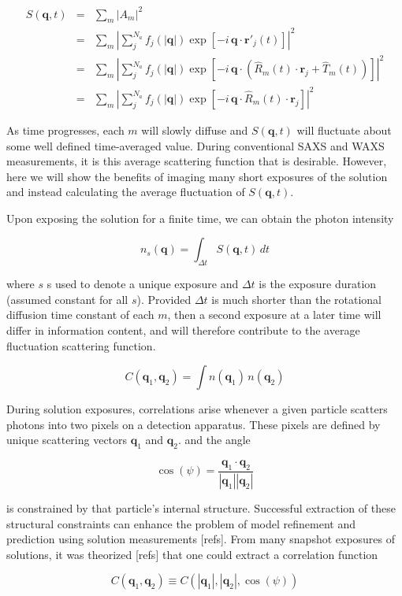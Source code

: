 \documentclass [11pt,fleqn]{article}
\def \be {\begin{equation}}
\def \ee {\end{equation}}
\def \beq {\begin{eqnarray}}
\def \eeq {\end{eqnarray}}
\begin{document}
\beq \label{ scatter}
S( \bm q, t) &=& \sum_m \left | A_m \right|^2 \\
&=& \sum_m \left | \sum_{j}^{N_a} f_j(|\bm q|) \exp [ -i \,\bm q \cdot \bm  r\prime _j (t)]  \right | ^2   \\
&=& \sum_m \left | \sum_{j}^{N_a} f_j(|\bm q|) \exp [ -i \,\bm q \cdot (\hat {R}_m (t)\cdot \bm r_j + \hat {T}_m(t) )]  \right | ^2 \\
&=& \sum_m \left | \sum_{j}^{N_a} f_j(|\bm q|) \exp [ -i \,\bm q \cdot \hat {R}_m (t)\cdot \bm r_j ]  \right | ^2 
\eeq

As time progresses, each $m$ will slowly diffuse and $S(\bm q, t)$ will fluctuate about some well defined time-averaged value. During conventional SAXS and WAXS measurements, it is this average scattering function that is desirable. However, here we will show the benefits of imaging many short exposures of the solution and instead calculating the average fluctuation of $S( \bm q, t ) $.

Upon exposing the solution for a finite time, we can obtain the photon intensity

\be
n_s( \bm q ) = \int_{\Delta t} S( \bm q, t ) \,dt
\ee

where $s$ s used to denote a unique exposure and $\Delta t$ is the exposure duration (assumed constant for all $s$). Provided $\Delta t$ is much shorter than the rotational diffusion time constant of each $m$, then a second exposure at a later time will differ in information content, and will therefore contribute to the average fluctuation scattering function. 

\be
C ( \bm q_1, \bm q_2 ) = \int n( \bm q_1) \, n( \bm q_2) 
\ee

During solution exposures, correlations arise whenever a given particle scatters photons into two pixels on a detection apparatus. These pixels are defined by unique scattering vectors $\bm q_1$ and $\bm q_2$. and the angle

\be
\cos (\psi) = \frac{\bm q_1 \cdot \bm q_2}{|\bm q_1| |\bm q_2| } 
\ee

is constrained by that particle's internal structure. Successful extraction of these structural constraints can enhance the problem of model refinement and prediction using solution measurements [refs]. From many snapshot exposures of solutions, it was theorized [refs] that one could extract a correlation function

\be \label{corr}
C(\bm q_1, \bm q_2) \equiv C(|\bm q_1|,| \bm q_2|,\cos (\psi) ) 
\ee
\end{document}
